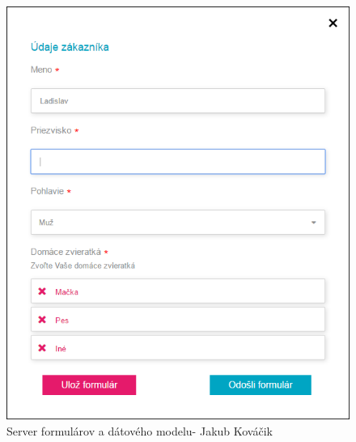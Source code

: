 \begin{figure}[H]
	\centering
	\includegraphics[width=0.4\linewidth]{images/kubko}
	\caption{Server formulárov a dátového modelu- Jakub Kováčik}
	\label{fig:Server formulárov a dátového modelu- Jakub Kováčik}
\end{figure}


	


	

